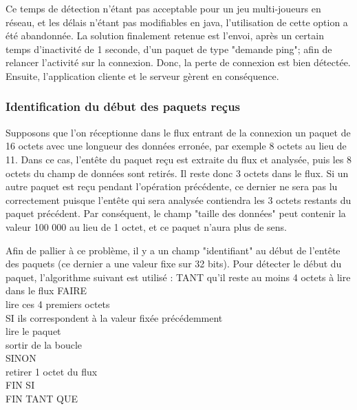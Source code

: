 \documentclass[11pt, a4paper]{report}
\begin{document}
	Ce temps de détection n'étant pas acceptable pour un jeu multi-joueurs en réseau, et les délais n'étant pas modifiables en java, l'utilisation de cette 
	option a été abandonnée. La solution finalement retenue est l'envoi, après un certain temps d'inactivité de 1 seconde, d'un paquet de type "demande ping";
	afin de relancer l'activité sur la connexion. Donc, la perte de connexion est bien détectée. Ensuite, l'application cliente et le serveur gèrent en conséquence.
	\newline
      
      \subsubsection{Identification du début des paquets reçus}
      
	Supposons que l'on réceptionne dans le flux entrant de la connexion un paquet de 16 octets avec une longueur des données erronée, par exemple 8 octets 
	au lieu de 11. Dans ce cas, l'entête du paquet reçu est extraite du flux et analysée, puis les 8 octets du champ de données sont retirés. Il reste donc
	3 octets dans le flux. Si un autre paquet est reçu pendant l'opération précédente, ce dernier ne sera pas lu correctement puisque l'entête qui sera analysée 
	contiendra les 3 octets restants du paquet précédent. Par conséquent, le champ "taille des données" peut contenir la valeur 100 000 au lieu de 1 octet,
	et ce paquet n'aura plus de sens.
	\newline
	
	Afin de pallier à ce problème, il y a un champ "identifiant" au début de l'entête des paquets (ce dernier a une valeur fixe sur 32 bits). 
	Pour détecter le début du paquet, l'algorithme suivant est utilisé :
	\newpage
	\indent TANT qu'il reste au moins 4 octets à lire dans le flux FAIRE\\
	  \indent\indent lire ces 4 premiers octets\\
	  \indent\indent SI ils correspondent à la valeur fixée précédemment\\
	    \indent\indent\indent lire le paquet\\
	    \indent\indent\indent sortir de la boucle\\
	  \indent\indent SINON\\
	    \indent\indent\indent retirer 1 octet du flux\\
	  \indent\indent FIN SI\\
	\indent FIN TANT QUE\\
    
\end{document}
